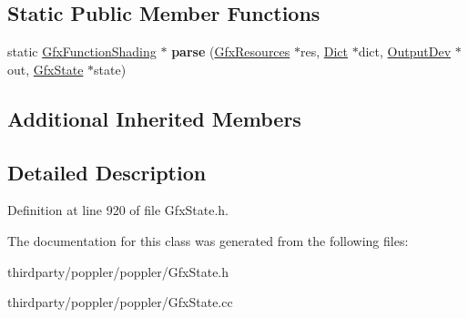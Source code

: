\subsection*{Static Public Member Functions}
\begin{DoxyCompactItemize}
\item 
\mbox{\label{class_gfx_function_shading_a30e2f4bbb00624f90e6e42aa1b903901}} 
static \hyperlink{class_gfx_function_shading}{Gfx\+Function\+Shading} $\ast$ {\bfseries parse} (\hyperlink{class_gfx_resources}{Gfx\+Resources} $\ast$res, \hyperlink{class_dict}{Dict} $\ast$dict, \hyperlink{class_output_dev}{Output\+Dev} $\ast$out, \hyperlink{class_gfx_state}{Gfx\+State} $\ast$state)
\end{DoxyCompactItemize}
\subsection*{Additional Inherited Members}


\subsection{Detailed Description}


Definition at line 920 of file Gfx\+State.\+h.



The documentation for this class was generated from the following files\+:\begin{DoxyCompactItemize}
\item 
thirdparty/poppler/poppler/Gfx\+State.\+h\item 
thirdparty/poppler/poppler/Gfx\+State.\+cc\end{DoxyCompactItemize}
